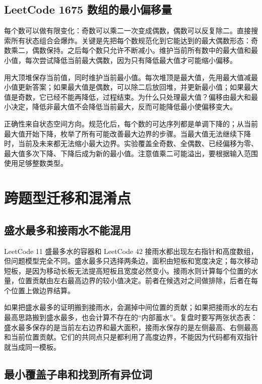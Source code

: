 \subsection{LeetCode 1675 数组的最小偏移量}

每个数可以做有限变化：奇数可以乘二一次变成偶数，偶数可以反复除二。直接搜索所有状态组合会爆炸。关键是先把每个数规范化到它能达到的最大偶数形态：奇数乘二，偶数保持。之后每个数只允许不断减小。维护当前所有数中的最大值和最小值，每次尝试降低当前最大偶数，因为只有降低最大值才可能缩小偏移。

用大顶堆保存当前值，同时维护当前最小值。每次堆顶是最大值，先用最大值减最小值更新答案；如果最大值是偶数，可以除二后放回堆，并更新最小值；如果最大值是奇数，它已经不能再降低，过程结束。为什么只处理最大值？偏移由最大和最小决定，降低非最大值不会降低当前最大，反而可能降低最小使偏移变大。

正确性来自状态空间方向。规范化后，每个数的可达序列都是单调下降的；从当前最大值开始下降，枚举了所有可能改善最大边界的步骤。当最大值无法继续下降时，当前及未来都无法缩小最大边界。实验覆盖全奇数、全偶数、已经偏移为零、最大值多次下降、下降后成为新的最小值。注意值乘二可能溢出，要根据输入范围使用足够整数类型。

\section{跨题型迁移和混淆点}

\subsection{盛水最多和接雨水不能混用}

LeetCode 11 盛最多水的容器和 LeetCode 42 接雨水都出现左右指针和高度数组，但问题模型完全不同。盛水最多只选择两条边，面积由短板和宽度决定；每次移动短板，是因为移动长板无法提高短板且宽度必然变小。接雨水则计算每个位置的水量，位置贡献由左右最高边界的较小值决定。前者在候选对之间做排除，后者在每个位置上做边界结算。

如果把盛水最多的证明搬到接雨水，会漏掉中间位置的贡献；如果把接雨水的左右最高思路搬到盛水最多，也会计算不存在的“内部蓄水”。复盘时要写两张状态表：盛水最多保存的是当前左右边界和最大面积，接雨水保存的是左侧最高、右侧最高和当前位置贡献。它们的共同点只是都利用了高度边界，不能因为代码都有双指针就当成同一模板。

\subsection{最小覆盖子串和找到所有异位词}


